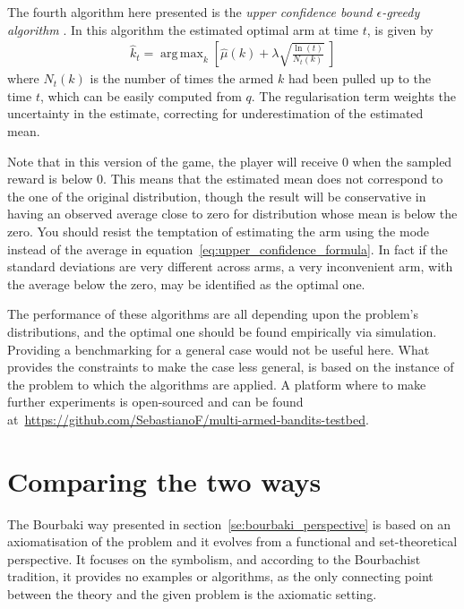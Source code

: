 \documentclass[]{scrartcl}
\DeclareMathOperator*{\argmax}{arg\,max}
\theoremstyle{definition}
\begin{document}
The fourth algorithm here presented is the \emph{upper confidence bound $\epsilon$-greedy algorithm} \cite{sutton2018reinforcement}. In this algorithm the estimated optimal arm at time $t$, is given by
\begin{align}\label{eq:upper_confidence_formula}
\hat{k}_t = \argmax_{k} \left[ \hat{\mu}(k) + \lambda \sqrt{ \frac{\ln(t)}{ N_{t}(k) }  } ~\right]
\end{align}
where $N_{t}(k)$ is the number of times the armed $k$ had been pulled up to the time $t$, which can be easily computed from $q$. The regularisation term weights the uncertainty in the estimate, correcting for underestimation of the estimated mean.

Note that in this version of the game, the player will receive $0$ when the sampled reward is below $0$. This means that the estimated mean does not correspond to the one of the original distribution, though the result will be conservative in having an observed average close to zero for distribution whose mean is below the zero. You should resist the temptation of estimating the arm using the mode instead of the average in equation~\ref{eq:upper_confidence_formula}. In fact if the standard deviations are very different across arms, a very inconvenient arm, with the average below the zero, may be identified as the optimal one.

The performance of these algorithms are all depending upon the problem's distributions, and the optimal one should be found empirically via simulation. Providing a benchmarking for a general case would not be useful here. What provides the constraints to make the case less general, is based on the instance of the problem to which the algorithms are applied. A platform where to make further experiments is open-sourced and can be found at~\href{https://github.com/SebastianoF/multi-armed-bandits-testbed}{https://github.com/SebastianoF/multi-armed-bandits-testbed}.


\section{Comparing the two ways}
\label{se:outro}

The Bourbaki way presented in section~\ref{se:bourbaki_perspective} is based on an axiomatisation of the problem and it evolves from a functional and set-theoretical perspective. It focuses on the symbolism, and according to the Bourbachist tradition, it provides no examples or algorithms, as the only connecting point between the theory and the given problem is the axiomatic setting.
\end{document}
